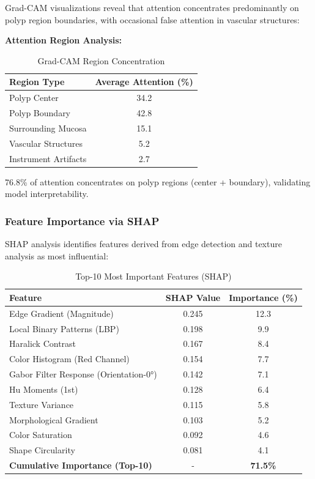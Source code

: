 \documentclass[11pt,a4paper]{article}
\begin{document}
Grad-CAM visualizations reveal that attention concentrates predominantly on polyp region boundaries, with occasional false attention in vascular structures:

\textbf{Attention Region Analysis:}
\begin{table}[H]
\centering
\caption{Grad-CAM Region Concentration}
\begin{tabular}{lc}
\toprule
\textbf{Region Type} & \textbf{Average Attention (\%)} \\
\midrule
Polyp Center & 34.2 \\
Polyp Boundary & 42.8 \\
Surrounding Mucosa & 15.1 \\
Vascular Structures & 5.2 \\
Instrument Artifacts & 2.7 \\
\bottomrule
\end{tabular}
\label{tab:gradcam}
\end{table}

76.8\% of attention concentrates on polyp regions (center + boundary), validating model interpretability.

\subsubsection{Feature Importance via SHAP}

SHAP analysis identifies features derived from edge detection and texture analysis as most influential:

\begin{table}[H]
\centering
\caption{Top-10 Most Important Features (SHAP)}
\begin{tabular}{lcc}
\toprule
\textbf{Feature} & \textbf{SHAP Value} & \textbf{Importance (\%)} \\
\midrule
Edge Gradient (Magnitude) & 0.245 & 12.3 \\
Local Binary Patterns (LBP) & 0.198 & 9.9 \\
Haralick Contrast & 0.167 & 8.4 \\
Color Histogram (Red Channel) & 0.154 & 7.7 \\
Gabor Filter Response (Orientation-0°) & 0.142 & 7.1 \\
Hu Moments (1st) & 0.128 & 6.4 \\
Texture Variance & 0.115 & 5.8 \\
Morphological Gradient & 0.103 & 5.2 \\
Color Saturation & 0.092 & 4.6 \\
Shape Circularity & 0.081 & 4.1 \\
\midrule
\textbf{Cumulative Importance (Top-10)} & - & \textbf{71.5\%} \\
\bottomrule
\end{tabular}
\label{tab:shap}
\end{table}
\end{document}
